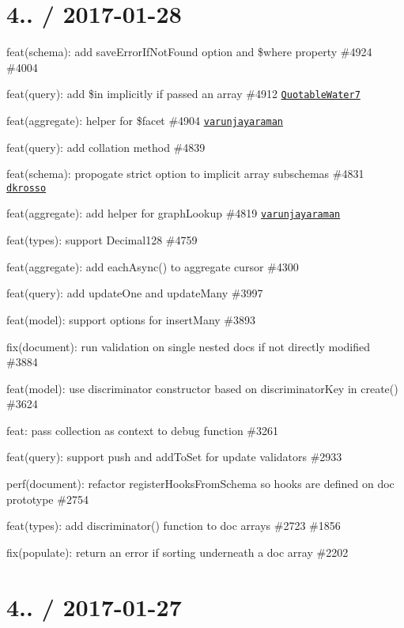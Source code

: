 \section*{4.. / 2017-\/01-\/28 }


\begin{DoxyItemize}
\item feat(schema)\+: add save\+Error\+If\+Not\+Found option and \$where property \#4924 \#4004
\item feat(query)\+: add \$in implicitly if passed an array \#4912 \href{https://github.com/QuotableWater7}{\tt Quotable\+Water7}
\item feat(aggregate)\+: helper for \$facet \#4904 \href{https://github.com/varunjayaraman}{\tt varunjayaraman}
\item feat(query)\+: add collation method \#4839
\item feat(schema)\+: propogate strict option to implicit array subschemas \#4831 \href{https://github.com/dkrosso}{\tt dkrosso}
\item feat(aggregate)\+: add helper for graph\+Lookup \#4819 \href{https://github.com/varunjayaraman}{\tt varunjayaraman}
\item feat(types)\+: support Decimal128 \#4759
\item feat(aggregate)\+: add each\+Async() to aggregate cursor \#4300
\item feat(query)\+: add update\+One and update\+Many \#3997
\item feat(model)\+: support options for insert\+Many \#3893
\item fix(document)\+: run validation on single nested docs if not directly modified \#3884
\item feat(model)\+: use discriminator constructor based on discriminator\+Key in create() \#3624
\item feat\+: pass collection as context to debug function \#3261
\item feat(query)\+: support push and add\+To\+Set for update validators \#2933
\item perf(document)\+: refactor register\+Hooks\+From\+Schema so hooks are defined on doc prototype \#2754
\item feat(types)\+: add discriminator() function to doc arrays \#2723 \#1856
\item fix(populate)\+: return an error if sorting underneath a doc array \#2202
\end{DoxyItemize}

\section*{4.. / 2017-\/01-\/27 }


